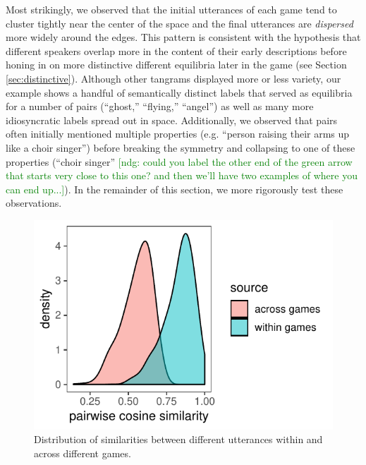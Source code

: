 \documentclass[alpha-refs]{wiley-article}
\newcommand{\ndg}[1]{\textcolor{green}{[ndg: #1]}}
\begin{document}
Most strikingly, we observed that the initial utterances of each game tend to cluster tightly near the center of the space and the final utterances are \emph{dispersed} more widely around the edges. 
This pattern is consistent with the hypothesis that different speakers overlap more in the content of their early descriptions before honing in on more distinctive different equilibria later in the game (see Section \ref{sec:distinctive}). 
Although other tangrams displayed more or less variety, our example shows a handful of semantically distinct labels that served as equilibria for a number of pairs (``ghost,'' ``flying,'' ``angel'') as well as many more idiosyncratic labels spread out in space.
Additionally, we observed that pairs often initially mentioned multiple properties (e.g. ``person raising their arms up like a choir singer'') before breaking the symmetry and collapsing to one of these properties (``choir singer'' \ndg{could you label the other end of the green arrow that starts very close to this one? and then we'll have two examples of where you can end up...}).
In the remainder of this section, we more rigorously test these observations.

\begin{figure}[t!]
\centering
\includegraphics[scale=.75]{across_vs_within.pdf}
\caption{Distribution of similarities between different utterances within and across different games.}
\label{fig:withinvsacross}
\end{figure}
\end{document}
